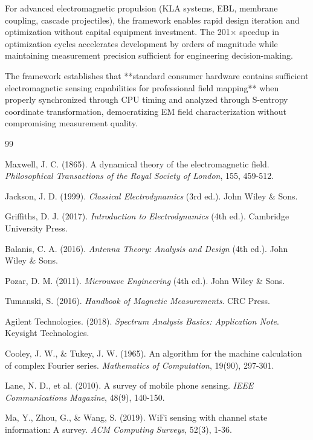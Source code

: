 \documentclass[12pt,a4paper]{article}
\begin{document}
For advanced electromagnetic propulsion (KLA systems, EBL, membrane coupling, cascade projectiles), the framework enables rapid design iteration and optimization without capital equipment investment. The 201× speedup in optimization cycles accelerates development by orders of magnitude while maintaining measurement precision sufficient for engineering decision-making.

The framework establishes that **standard consumer hardware contains sufficient electromagnetic sensing capabilities for professional field mapping** when properly synchronized through CPU timing and analyzed through S-entropy coordinate transformation, democratizing EM field characterization without compromising measurement quality.


\begin{thebibliography}{99}

Maxwell, J. C. (1865). A dynamical theory of the electromagnetic field. \textit{Philosophical Transactions of the Royal Society of London}, 155, 459-512.

Jackson, J. D. (1999). \textit{Classical Electrodynamics} (3rd ed.). John Wiley \& Sons.

Griffiths, D. J. (2017). \textit{Introduction to Electrodynamics} (4th ed.). Cambridge University Press.

Balanis, C. A. (2016). \textit{Antenna Theory: Analysis and Design} (4th ed.). John Wiley \& Sons.

Pozar, D. M. (2011). \textit{Microwave Engineering} (4th ed.). John Wiley \& Sons.

Tumanski, S. (2016). \textit{Handbook of Magnetic Measurements}. CRC Press.

Agilent Technologies. (2018). \textit{Spectrum Analysis Basics: Application Note}. Keysight Technologies.

Cooley, J. W., \& Tukey, J. W. (1965). An algorithm for the machine calculation of complex Fourier series. \textit{Mathematics of Computation}, 19(90), 297-301.

Lane, N. D., et al. (2010). A survey of mobile phone sensing. \textit{IEEE Communications Magazine}, 48(9), 140-150.

Ma, Y., Zhou, G., & Wang, S. (2019). WiFi sensing with channel state information: A survey. \textit{ACM Computing Surveys}, 52(3), 1-36.


\end{thebibliography}
\end{document}

